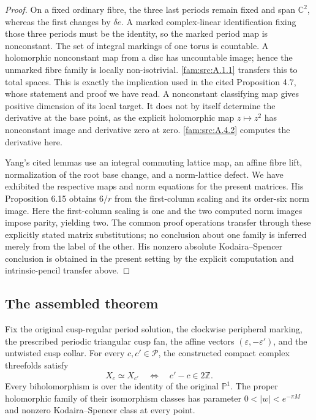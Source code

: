 \begin{proof}
On a fixed ordinary fibre, the three last periods remain fixed and span $\mathbb C^2$, whereas the first changes by $\delta e$. A marked complex-linear identification fixing those three periods must be the identity, so the marked period map is nonconstant. The set of integral markings of one torus is countable. A holomorphic nonconstant map from a disc has uncountable image; hence the unmarked fibre family is locally non-isotrivial. \ref{fam:src:A.1.1} transfers this to total spaces. This is exactly the implication used in the cited Proposition 4.7, whose statement and proof we have read. A nonconstant classifying map gives positive dimension of its local target. It does not by itself determine the derivative at the base point, as the explicit holomorphic map $z\mapsto z^2$ has nonconstant image and derivative zero at zero. \ref{fam:src:A.4.2} computes the derivative here.

Yang's cited lemmas use an integral commuting lattice map, an affine fibre lift, normalization of the root base change, and a norm-lattice defect. We have exhibited the respective maps and norm equations for the present matrices. His Proposition 6.15 obtains $6/r$ from the first-column scaling and its order-six norm image. Here the first-column scaling is one and the two computed norm images impose parity, yielding two. The common proof operations transfer through these explicitly stated matrix substitutions; no conclusion about one family is inferred merely from the label of the other. His nonzero absolute Kodaira--Spencer conclusion is obtained in the present setting by the explicit computation and intrinsic-pencil transfer above.
\end{proof}

\subsection{The assembled theorem}\label{fam:section:A.5}

\begin{theorem}\label{fam:src:A.5.1}\label{fam:st:A.5.1}\label{wb:pshift:thm:classification}
Fix the original cusp-regular period solution, the clockwise peripheral marking, the prescribed periodic triangular cusp fan, the affine vectors $(\varepsilon,-\varepsilon')$, and the untwisted cusp collar. For every $c,c'\in\mathcal P$, the constructed compact complex threefolds satisfy
\[
 X_c\simeq X_{c'}\quad\Longleftrightarrow\quad c'-c\in2\mathbb Z.
\]
Every biholomorphism is over the identity of the original $\mathbb P^1$. The proper holomorphic family of their isomorphism classes has parameter $0<|w|<e^{-\pi M}$ and nonzero Kodaira--Spencer class at every point.
\end{theorem}


